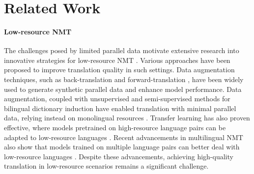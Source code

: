 \section{Related Work}

\paragraph{Low-resource NMT}
The challenges posed by limited parallel data motivate extensive research into innovative strategies for low-resource NMT
\citep{haddow-etal-2022-survey,yazar2023lowresource}. 
Various approaches have been proposed to improve translation quality in such settings. Data augmentation techniques, such as back-translation \citep{sennrich-etal-2016-improving,edunov-etal-2018-understanding} and forward-translation \citep{bogoychev2020domaintranslationesenoisesynthetic}, have been widely used to generate synthetic parallel data and enhance model performance. 
Data augmentation, coupled with unsupervised and semi-supervised methods for bilingual dictionary induction have enabled translation with minimal parallel data, relying instead on monolingual resources \citep{Lample2018unsupervised,Artetxe2018Unsupervised}.
Transfer learning has also proven effective, where models pretrained on high-resource language pairs can be adapted to low-resource languages \citep{zoph-etal-2016-transfer}. 
Recent advancements in multilingual NMT also show that models trained on multiple language pairs can better deal with low-resource languages \citep{ko-etal-2021-adapting,mohammadshahi-etal-2022-small,nllbteam2022languageleftbehindscaling}.
Despite these advancements, achieving high-quality translation in low-resource scenarios remains a significant challenge.

